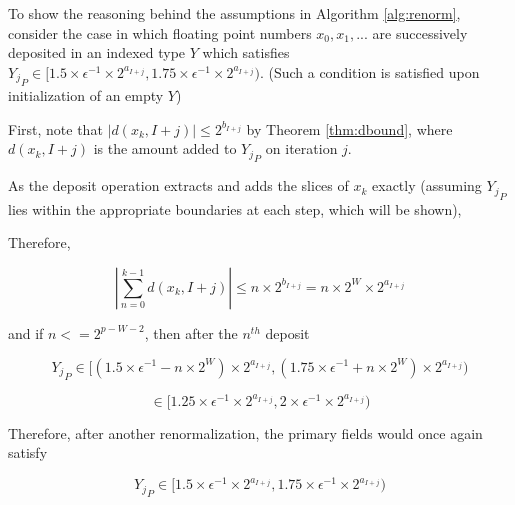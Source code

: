 \documentclass[12pt]{article}
\theoremstyle{definition}
\numberwithin{equation}{section}
\begin{document}
    To show the reasoning behind the assumptions in Algorithm \ref{alg:renorm}, consider the case in which floating point numbers $x_0, x_1, ...$ are successively deposited in an indexed type $Y$ which satisfies ${Y_j}_P \in [1.5 \times \epsilon^{-1}\times 2^{a_{I + j}}, 1.75 \times \epsilon^{-1}\times 2^{a_{I + j}})$. (Such a condition is satisfied upon initialization of an empty $Y$)

    First, note that $|d(x_k, I + j)| \leq 2^{b_{I + j}}$ by Theorem \ref{thm:dbound}, where $d(x_k, I + j)$ is the amount added to ${Y_j}_P$ on iteration $j$.

    As the deposit operation extracts and adds the slices of $x_k$ exactly (assuming ${Y_j}_P$ lies within the appropriate boundaries at each step, which will be shown),

    Therefore,

    \begin{equation*}
    |\sum \limits_{n = 0}^{k - 1} d(x_k, I + j)| \leq n \times 2^{b_{I + j}} = n \times 2^{W} \times 2^{a_{I + j}}
    \end{equation*}

    and if $n <= 2^{p - W - 2}$, then after the $n^{th}$ deposit

    \begin{equation*}
    {Y_j}_P \in [(1.5 \times \epsilon^{-1} - n \times 2^W)\times 2^{a_{I + j}}, (1.75 \times \epsilon^{-1} + n \times 2^W)\times 2^{a_{I + j}})
    \end{equation*}

    \begin{equation*}
    \in [1.25 \times \epsilon^{-1}\times 2^{a_{I + j}}, 2 \times \epsilon^{-1}\times 2^{a_{I + j}})
    \end{equation*}

    Therefore, after another renormalization, the primary fields would once again satisfy

    \begin{equation*}
    {Y_j}_P \in [1.5 \times \epsilon^{-1}\times 2^{a_{I + j}}, 1.75 \times \epsilon^{-1}\times 2^{a_{I + j}})
    \end{equation*}
\end{document}
